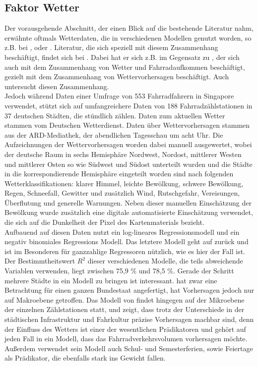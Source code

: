 \documentclass[a4paper,12pt]{thesis}
\begin{document}
\subsection{Faktor Wetter}

Der vorausgehende Abschnitt, der einen Blick auf die bestehende Literatur nahm, erwähnte oftmals Wetterdaten, die in verschiedenen Modellen genutzt worden, so z.B. bei \cite{Holmgren2017}, \cite{Broucke2019} oder \cite{Li2015}. Literatur, die sich speziell mit diesem Zusammenhang beschäftigt, findet sich bei \cite{Wessel2020}. Dabei hat er sich z.B. im Gegensatz zu \cite{Nankervis1999}, der sich auch mit dem Zusammenhang von Wetter und Fahrradaufkommen beschäftigt, gezielt mit dem Zusammenhang von Wettervorhersagen beschäftigt. Auch \cite{Meng2016} untersucht diesen Zusammenhang.\\
Jedoch während \cite{Meng2016} Daten einer Umfrage von 553 Fahrradfahrern in Singapore verwendet, stützt sich \cite{Wessel2020} auf umfangreichere Daten von 188 Fahrradzählstationen in 37 deutschen Städten, die stündlich zählen. Daten zum aktuellen Wetter stammen vom Deutschen Wetterdienst. Daten über Wettervorhersagen stammen aus der ARD-Mediathek, der abendlichen Tagesschau um acht Uhr. Die Aufzeichnungen der Wettervorhersagen worden dabei manuell ausgewertet, wobei der deutsche Raum in sechs Hemisphäre Nordwest, Nordost, mittlerer Westen und mittlerer Osten so wie Südwest und Südost unterteilt wurden und die Städte in die korrespondierende Hemisphäre eingeteilt worden sind nach folgenden Wetterklassifikationen: klarer Himmel, leichte Bewölkung, schwere Bewölkung, Regen, Schneefall, Gewitter und zusätzlich Wind, Rutschgefahr, Vereisungen, Überflutung und generelle Warnungen. Neben dieser manuellen Einschätzung der Bewölkung wurde zusätzlich eine digitale automatisierte Einschätzung verwendet, die sich auf die Dunkelheit der Pixel des Kartenmaterials bezieht.\\
Aufbauend auf diesen Daten nutzt \cite{Wessel2020} ein log-lineares Regressionsmodell und ein negativ binomiales Regressions Modell. Das letztere Modell geht auf \cite{Hausman1984} zurück und ist im Besonderen für ganzzahlige Regressoren nützlich, wie es hier der Fall ist. Der Bestimmtheitswert $R^2$ dieser verschiedenen Modelle, die teils abweichende Variablen verwenden, liegt zwischen 75,9 \% und 78,5 \%. Gerade der Schritt mehrere Städte in ein Modell zu bringen ist interessant. \cite{Saha2018} hat zwar eine Betrachtung für einen ganzen Bundestaat angefertigt, hat Vorhersagen jedoch nur auf Makroebene getroffen. Das Modell von \cite{Wessel2020} findet hingegen auf der Mikroebene der einzelnen Zählstationen statt, und zeigt, dass trotz der Unterschiede in der städtischen Infrastruktur und Fahrkultur präzise Vorhersagen machbar sind, denn der Einfluss des Wetters ist einer der wesentlichen Prädikatoren und gehört auf jeden Fall in ein Modell, dass das Fahrradverkehrsvolumen vorhersagen möchte. Außerdem verwendet sein Modell auch Schul- und Semesterferien, sowie Feiertage als Prädikator, die ebenfalls stark ins Gewicht fallen.\\
\end{document}
